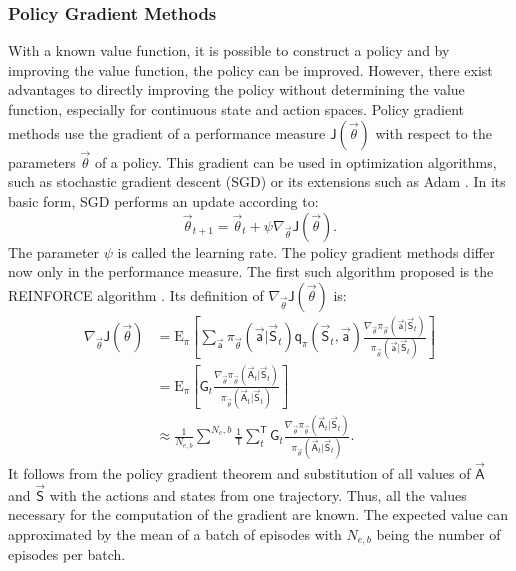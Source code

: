 \subsubsection{Policy Gradient Methods}
\label{sec:pgm}
With a known value function, it is possible to construct a policy and by improving the value function, the policy can be improved. However, there exist advantages to directly improving the policy without determining the value function, especially for continuous state and action spaces. Policy gradient methods use the gradient of a performance measure $\mathsf{J}(\vec{\theta})$ with respect to the parameters $\vec{\theta}$ of a policy. This gradient can be used in optimization algorithms, such as stochastic gradient descent (SGD) \cite[p. 201]{sutton_reinforcement_2018} or its extensions such as Adam \cite{kingma_adam_2017}. In its basic form, SGD performs an update according to:
\begin{equation}
\vec{\theta}_{t+1} = \vec{\theta}_t + \psi \nabla_{\vec{\theta}} \mathsf{J}(\vec{\theta}). \label{eq:sgd}
\end{equation}
The parameter $\psi$ is called the learning rate. The policy gradient methods differ now only in the performance measure. The first such algorithm proposed is the REINFORCE algorithm \cite{williams_simple_1992}. Its definition of $\nabla_{\vec{\theta}} \mathsf{J}(\vec{\theta})$ is:
\begin{align}
\nabla_{\vec{\theta}} \mathsf{J}(\vec{\theta})
&= \mathrm{E}_\pi \left[ \sum_{\vec{\mathsf{a}}} \pi_{\vec{\theta}} (\vec{\mathsf{a}}\vert \vec{\mathsf{S}}_t) \mathsf{q}_\pi(\vec{\mathsf{S}}_t, \vec{\mathsf{a}})
\frac{\nabla_{\vec{\theta}} \pi_{\vec{\theta}}(\vec{\mathsf{a}}\vert \vec{\mathsf{S}}_t)}{\pi_{\vec{\theta}}(\vec{\mathsf{a}}\vert \vec{\mathsf{S}}_t)} \right]\label{eq:reinforce} \\
&= \mathrm{E}_\pi \left[\mathsf{G}_t \frac{\nabla_{\vec{\theta}} \pi_{\vec{\theta}}(\vec{\mathsf{A}}_t\vert \vec{\mathsf{S}}_t)}{\pi_{\vec{\theta}}(\vec{\mathsf{A}}_t\vert \vec{\mathsf{S}}_t)} \right] \\
&\approx \frac{1}{N_{e,b}}\sum^{N_e,b} \frac{1}{\mathsf{T}}\sum_t^\mathsf{T} \mathsf{G}_t \frac{\nabla_{\vec{\theta}} \pi_{\vec{\theta}}(\vec{\mathsf{A}}_t\vert \vec{\mathsf{S}}_t)}{\pi_{\vec{\theta}}(\vec{\mathsf{A}}_t\vert \vec{\mathsf{S}}_t)}.
\end{align} It follows from the policy gradient theorem and substitution of all values of $\vec{\mathsf{A}}$ and $\vec{\mathsf{S}}$ with the actions and states from one trajectory. Thus, all the values necessary for the computation of the gradient are known. The expected value can approximated by the mean of a batch of episodes with $N_{e,b}$ being the number of episodes per batch. \cite[p.324-328]{sutton_reinforcement_2018} \\
